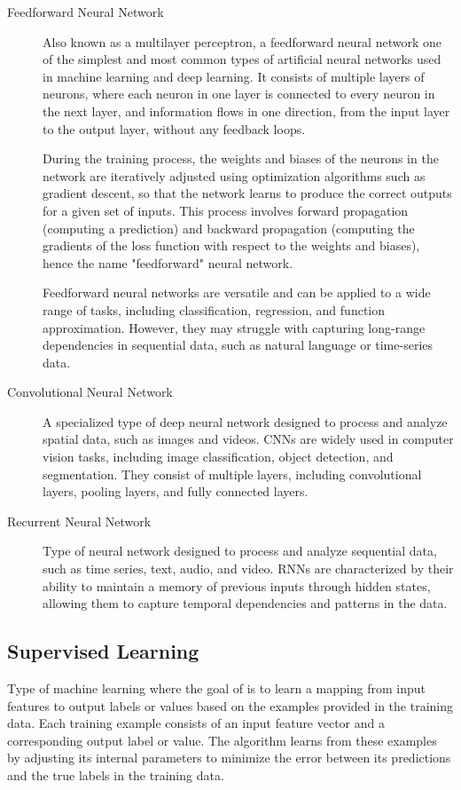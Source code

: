 \documentclass[a4paper]{report}
\begin{document}
\begin{description}
\item[Feedforward Neural Network]
Also known as a multilayer perceptron, a feedforward neural network one of the simplest and most common types of artificial neural networks used in machine learning and deep learning. It consists of multiple layers of neurons, where each neuron in one layer is connected to every neuron in the next layer, and information flows in one direction, from the input layer to the output layer, without any feedback loops.

During the training process, the weights and biases of the neurons in the network are iteratively adjusted using optimization algorithms such as gradient descent, so that the network learns to produce the correct outputs for a given set of inputs. This process involves forward propagation (computing a prediction) and backward propagation (computing the gradients of the loss function with respect to the weights and biases), hence the name "feedforward" neural network.

Feedforward neural networks are versatile and can be applied to a wide range of tasks, including classification, regression, and function approximation. However, they may struggle with capturing long-range dependencies in sequential data, such as natural language or time-series data.

\item[Convolutional Neural Network] 
A specialized type of deep neural network designed to process and analyze spatial data, such as images and videos. CNNs are widely used in computer vision tasks, including image classification, object detection, and segmentation. They consist of multiple layers, including convolutional layers, pooling layers, and fully connected layers.

\item[Recurrent Neural Network]
Type of neural network designed to process and analyze sequential data, such as time series, text, audio, and video. RNNs are characterized by their ability to maintain a memory of previous inputs through hidden states, allowing them to capture temporal dependencies and patterns in the data.
\end{description}


\subsection*{Supervised Learning}
Type of machine learning where the goal of is to learn a mapping from input features to output labels or values based on the examples provided in the training data. Each training example consists of an input feature vector and a corresponding output label or value. The algorithm learns from these examples by adjusting its internal parameters to minimize the error between its predictions and the true labels in the training data.
\end{document}
